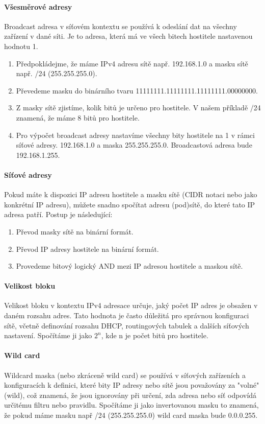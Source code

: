 \paragraph{Všesměrové adresy}
Broadcast adresa v síťovém kontextu se používá k odeslání dat na všechny zařízení v dané síti. Je to adresa, která má ve všech bitech hostitele nastavenou hodnotu 1.
\begin{enumerate}
    \item Předpokládejme, že máme IPv4 adresu sítě např. 192.168.1.0 a masku sítě např. /24 (255.255.255.0).
    \item Převedeme masku do binárního tvaru 11111111.11111111.11111111.00000000.
    \item Z masky sítě zjistíme, kolik bitů je určeno pro hostitele. V našem příkladě /24 znamená, že máme 8 bitů pro hostitele.
    \item Pro výpočet broadcast adresy nastavíme všechny bity hostitele na 1 v rámci síťové adresy. 192.168.1.0 a maska 255.255.255.0. Broadcastová adresa bude 192.168.1.255. 
\end{enumerate}

\paragraph{Síťové adresy}
Pokud máte k dispozici IP adresu hostitele a masku sítě (CIDR notaci nebo jako konkrétní IP adresu), můžete snadno spočítat adresu (pod)sítě, do které tato IP adresa patří. Postup je následující:
\begin{enumerate}
    \item Převod masky sítě na binární formát.
    \item Převod IP adresy hostitele na binární formát.
    \item Provedeme bitový logický AND mezi IP adresou hostitele a maskou sítě.
\end{enumerate}

\paragraph{Velikost bloku}
Velikost bloku v kontextu IPv4 adresace určuje, jaký počet IP adres je obsažen v daném rozsahu adres. Tato hodnota je často důležitá pro správnou konfiguraci sítě, včetně definování rozsahu DHCP, routingových tabulek a dalších síťových nastavení. Spočítáme ji jako $2^n$, kde n je počet bitů pro hostitele.

\paragraph{Wild card}
Wildcard maska (nebo zkráceně wild card) se používá v síťových zařízeních a konfiguracích k definici, které bity IP adresy nebo sítě jsou považovány za "volné" (wild), což znamená, že jsou ignorovány při určení, zda adresa nebo síť odpovídá určitému filtru nebo pravidlu. Spočítáme ji jako invertovanou masku to znamená, že pokud máme masku např /24 (255.255.255.0) wild card maska bude 0.0.0.255.

